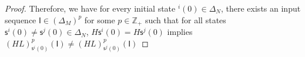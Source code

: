 \begin{proof}
Therefore, we have for every initial state \State$^{i}(0)$$\in \Delta_N$, there exists an input sequence $\mathsf{I}\in(\Delta_M)^p$ for some $p\in \mathbb{Z}_+$ such that for all states $\mathsf{s}^{i}(0)\neq \mathsf{s}^{j}(0)\in \Delta_N$, $H\mathsf{s}^{i}(0)=H\mathsf{s}^{j}(0)$ implies $(HL)^p_{\mathsf{s}^{i}(0)}(\mathsf{I})\neq (HL)^p_{{\mathsf{s}^{j}(0)}}(\mathsf{I})$

\end{proof}

